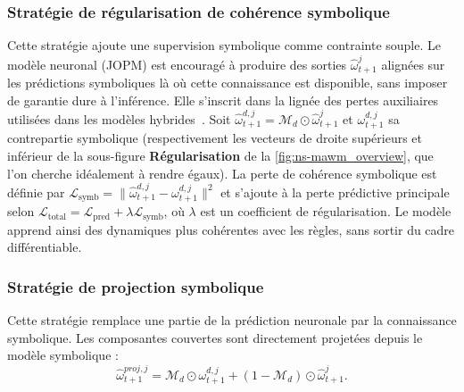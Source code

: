 \documentclass[final]{jfsma}
\theoremstyle{plain}
\theoremstyle{definition}
\theoremstyle{remark}
\begin{document}
\subsubsection{Stratégie de régularisation de cohérence symbolique}
\label{sec:symbolic_loss_regularization}

Cette stratégie ajoute une supervision symbolique comme contrainte souple. Le modèle neuronal (JOPM) est encouragé à produire des sorties $\hat{\omega}^{j}_{t+1}$ alignées sur les prédictions symboliques là où cette connaissance est disponible, sans imposer de garantie dure à l'inférence. Elle s'inscrit dans la lignée des pertes auxiliaires utilisées dans les modèles hybrides~\cite{Xu2018semanticloss, garcez2023neurosymbolic}. Soit $\hat{\omega}^{d,j}_{t+1} = \mathcal{M}_d \odot \hat{\omega}^j_{t+1}$ et $\omega^{d,j}_{t+1}$ sa contrepartie symbolique (respectivement les vecteurs de droite supérieurs et inférieur de la sous-figure \textbf{Régularisation} de la \autoref{fig:ns-mawm_overview}, que l'on cherche idéalement à rendre égaux).
%
La perte de cohérence symbolique est définie par $\mathcal{L}_{\text{symb}} = \| \hat{\omega}^{d,j}_{t+1} - \omega^{d,j}_{t+1} \|^2$ et s'ajoute à la perte prédictive principale selon $\mathcal{L}_{\text{total}} = \mathcal{L}_{\text{pred}} + \lambda \mathcal{L}_{\text{symb}}$, où $\lambda$ est un coefficient de régularisation. Le modèle apprend ainsi des dynamiques plus cohérentes avec les règles, sans sortir du cadre différentiable.

\subsubsection{Stratégie de projection symbolique}
\label{sec:symbolic_projection}

Cette stratégie remplace une partie de la prédiction neuronale par la connaissance symbolique. Les composantes couvertes sont directement projetées depuis le modèle symbolique :
\begin{equation}
  \label{eq:projection}
  \hat{\omega}^{proj,j}_{t+1} = \mathcal{M}_d \odot \omega^{d,j}_{t+1} + (1 - \mathcal{M}_d) \odot \hat{\omega}^j_{t+1}.
\end{equation}
\end{document}
